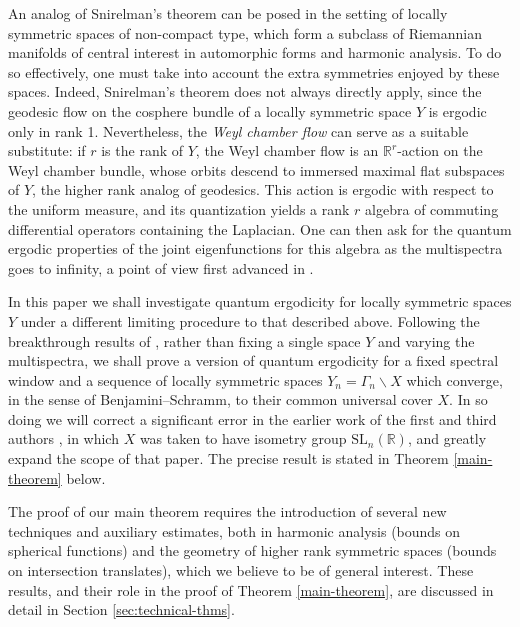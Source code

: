 \documentclass[12pt]{amsart}
\theoremstyle{remark}
\newcommand{\R}{\mathbb R}
\newcommand{\SL}{\text{SL} }
\begin{document}
An analog of Snirelman's theorem can be posed in the setting of locally symmetric spaces of non-compact type, which form a subclass of Riemannian manifolds of central interest in automorphic forms and harmonic analysis. To do so effectively, one must take into account the extra symmetries enjoyed by these spaces. Indeed, Snirelman's theorem does not always directly apply, since the geodesic flow on the cosphere bundle of a locally symmetric space $Y$ is ergodic only in rank 1. Nevertheless, the \textit{Weyl chamber flow} can serve as a suitable substitute: if $r$ is the rank of $Y$, the Weyl chamber flow is an $\R^r$-action on the Weyl chamber bundle, whose orbits descend to immersed maximal flat subspaces of $Y$, the higher rank analog of geodesics. This action is ergodic with respect to the uniform measure, and its quantization yields a rank $r$ algebra of commuting differential operators containing the Laplacian. One can then ask for the quantum ergodic properties of the joint eigenfunctions for this algebra as the multispectra goes to infinity, a point of view first advanced in \cite{Silberman_Venkatesh}.

In this paper we shall investigate quantum ergodicity for locally symmetric spaces $Y$ under a different limiting procedure to that described above. Following the breakthrough results of \cite{Anantharaman_Le_Masson, Le_Masson_Sahlsten_17}, rather than fixing a single space $Y$ and varying the multispectra, we shall prove a version of quantum ergodicity for a fixed spectral window and a sequence of locally symmetric spaces $Y_n=\Gamma_n\backslash X$ which converge, in the sense of Benjamini--Schramm, to their common universal cover $X$. In so doing we will correct a significant error in the earlier work of the first and third authors \cite{Brumley_Matz_23}, in which $X$ was taken to have isometry group $\SL_n(\R)$, and greatly expand the scope of that paper. The precise result is stated in Theorem \ref{main-theorem} below. 

The proof of our main theorem requires the introduction of several new techniques and auxiliary estimates, both in harmonic analysis (bounds on spherical functions) and the geometry of higher rank symmetric spaces (bounds on intersection translates), which we believe to be of general interest. These results, and their role in the proof of Theorem \ref{main-theorem}, are discussed in detail in Section \ref{sec:technical-thms}.
\end{document}
